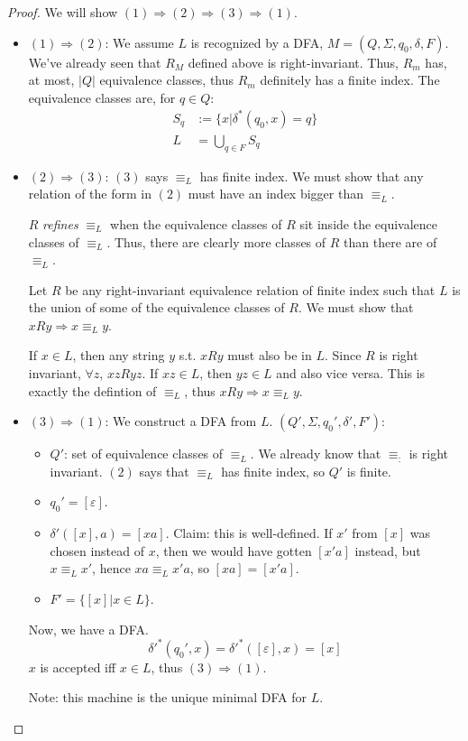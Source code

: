 \documentclass{article}
\begin{document}
\begin{proof}
We will show $(1) \Rightarrow (2) \Rightarrow (3) \Rightarrow (1)$.
\begin{itemize}
    \item $(1) \Rightarrow (2)$: We assume $L$ is recognized by a DFA, $M=(Q,\Sigma, q_0,\delta,F)$. We've already seen that $R_M$ defined above is right-invariant. Thus, $R_m$ has, at most, $|Q|$ equivalence classes, thus $R_m$ definitely has a finite index. The equivalence classes are, for $q \in Q$: 
    \begin{align*}
        S_q &:= \{x | \delta^*(q_0,x) = q\}\\
        L &=\bigcup_{q \in F} S_q
    \end{align*}
    \item $(2) \Rightarrow (3)$: $(3)$ says $\equiv_L$ has finite index. We must show that any relation of the form in $(2)$ must have an index bigger than $\equiv_L$.
    
    $R$ \textit{refines} $\equiv_L$ when the equivalence classes of $R$ sit inside the equivalence classes of $\equiv_L$. Thus, there are clearly more classes of $R$ than there are of $\equiv_L$.
    
    Let $R$ be any right-invariant equivalence relation of finite index such that $L$ is the union of some of the equivalence classes of $R$. We must show that $xRy \Rightarrow x \equiv_L y$.
    
    If $x \in L$, then any string $y$ s.t. $xRy$ must also be in $L$. Since $R$ is right invariant, $\forall z$, $xzRyz$. If $xz \in L$, then $yz \in L$ and also vice versa. This is exactly the defintion of $\equiv_L$, thus $xRy \Rightarrow x \equiv_L y$.
    \item $(3) \Rightarrow (1)$: We construct a DFA from $L$. $(Q',\Sigma,q_0', \delta',F')$:
    \begin{itemize}
        \item $Q'$: set of equivalence classes of $\equiv_L$. We already know that $\equiv_:$ is right invariant. $(2)$ says that $\equiv_L$ has finite index, so $Q'$ is finite.
        \item $q_0' = [\varepsilon]$.
        \item $\delta'([x],a) = [xa]$. Claim: this is well-defined. If $x'$ from $[x]$ was chosen instead of $x$, then we would have gotten $[x'a]$ instead, but $x \equiv_L x'$, hence $xa \equiv_L x'a$, so $[xa] = [x'a]$.
        \item $F' = \{[x] | x \in L\}$.
    \end{itemize}
    Now, we have a DFA.
    \[\delta'^*(q_0',x) = \delta'^*([\varepsilon],x) = [x]\]
    $x$ is accepted iff $x \in L$, thus $(3) \Rightarrow (1)$.
    
    Note: this machine is the unique minimal DFA for $L$.
\end{itemize}
\end{proof}
\end{document}
